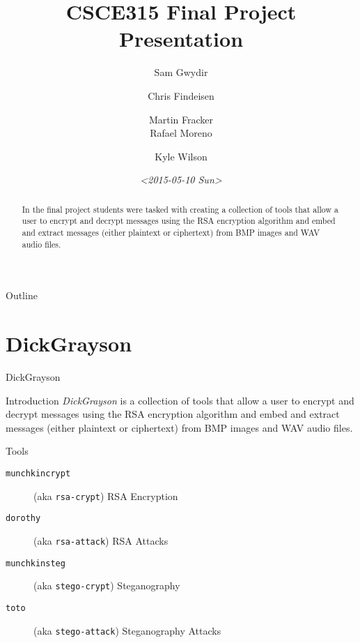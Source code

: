 \documentclass[presentation]{beamer}
\author{Sam Gwydir \and Chris Findeisen \and Martin Fracker \\ Rafael Moreno \and Kyle Wilson}
\date{\textit{<2015-05-10 Sun>}}
\title{CSCE315 Final Project Presentation}
\begin{document}
\maketitle
\begin{frame}{Outline}
\tableofcontents
\end{frame}


\section{DickGrayson}
\label{sec-1}
\begin{abstract}
In the final project students were tasked with creating a collection of tools
that allow a user to encrypt and decrypt messages using the RSA encryption
algorithm and embed and extract messages (either plaintext or ciphertext) from
BMP images and WAV audio files.
\end{abstract}

\begin{frame}[fragile,label=sec-1-1]{DickGrayson}
 \begin{block}{Introduction}
\emph{DickGrayson} is a collection of tools that allow a user to encrypt and decrypt
messages using the RSA encryption algorithm and embed and extract messages
(either plaintext or ciphertext) from BMP images and WAV audio files.
\end{block}

\begin{block}{Tools}
\begin{description}
\item[{\texttt{munchkincrypt}}] (aka \texttt{rsa-crypt}) RSA Encryption
\item[{\texttt{dorothy}}] (aka \texttt{rsa-attack}) RSA Attacks
\item[{\texttt{munchkinsteg}}] (aka \texttt{stego-crypt}) Steganography
\item[{\texttt{toto}}] (aka \texttt{stego-attack}) Steganography Attacks
\end{description}
\end{block}
\end{frame}
\end{document}
